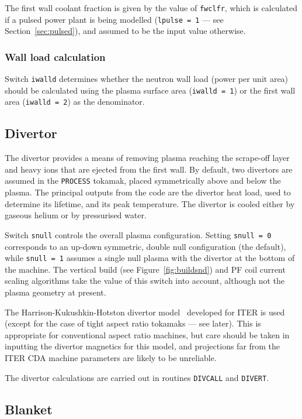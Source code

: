 \documentclass[11pt,a4paper]{report}
\newcommand{\process}{\mbox{\texttt{PROCESS}}}
\begin{document}
The first wall coolant fraction is given by the value of \texttt{fwclfr},
which is calculated if a pulsed power plant is being modelled (\texttt{lpulse
  = 1} --- see Section~\ref{sec:pulsed}), and assumed to be the input value
otherwise.

\subsubsection*{Wall load calculation}

Switch \texttt{iwalld} determines whether the neutron wall load (power per
unit area) should be calculated using the plasma surface area (\texttt{iwalld
  = 1}) or the first wall area (\texttt{iwalld = 2}) as the denominator.

\subsection{Divertor}
\label{sec:divertor}

The divertor provides a means of removing plasma reaching the scrape-off layer
and heavy ions that are ejected from the first wall.  By default, two
divertors are assumed in the \process\/ tokamak, placed symmetrically above
and below the plasma. The principal outputs from the code are the divertor
heat load, used to determine its lifetime, and its peak temperature. The
divertor is cooled either by gaseous helium or by pressurised water.

Switch \texttt{snull} controls the overall plasma configuration. Setting
\texttt{snull = 0} corresponds to an up-down symmetric, double null
configuration (the default), while \texttt{snull = 1} assumes a single null
plasma with the divertor at the bottom of the machine. The vertical build (see
Figure~\ref{fig:buildsnd}) and PF coil current scaling algorithms take the
value of this switch into account, although not the plasma geometry at
present.

The Harrison-Kukushkin-Hotston divertor model~\cite{IPDG} developed for ITER
is used (except for the case of tight aspect ratio tokamaks --- see
later). This is appropriate for conventional aspect ratio machines, but care
should be taken in inputting the divertor magnetics for this model, and
projections far from the ITER CDA machine parameters are likely to be
unreliable.

The divertor calculations are carried out in routines \texttt{DIVCALL} and
\texttt{DIVERT}.

\subsection{Blanket}
\end{document}
